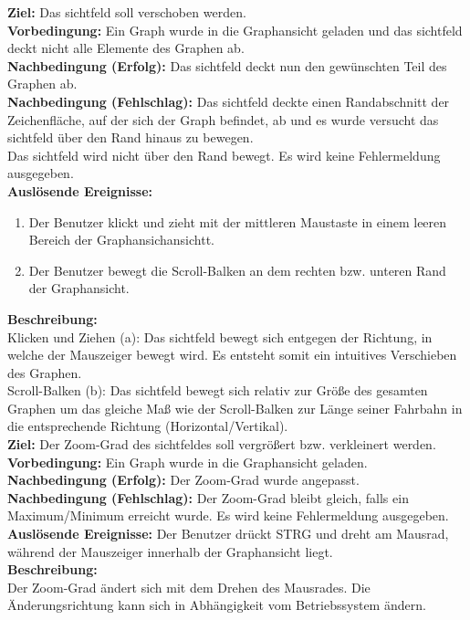\label{fa:verschieben}
\textbf{Ziel:} Das \gls{sichtfeld} soll verschoben werden.\\
\textbf{Vorbedingung:} Ein Graph wurde in die Graphansicht geladen und das \gls{sichtfeld} deckt nicht alle Elemente des Graphen ab.\\
\textbf{Nachbedingung (Erfolg):}  Das \gls{sichtfeld} deckt nun den gewünschten Teil des Graphen ab.\\
\textbf{Nachbedingung (Fehlschlag):} Das \gls{sichtfeld} deckte einen Randabschnitt der Zeichenfläche, auf der sich der Graph befindet, ab und es wurde versucht das \gls{sichtfeld} über den Rand hinaus zu bewegen.\\
Das \gls{sichtfeld} wird nicht über den Rand bewegt. Es wird keine Fehlermeldung ausgegeben.\\
\textbf{Auslösende Ereignisse:}
\begin{enumerate}[nolistsep, label=(\alph*)]
  \item Der Benutzer klickt und zieht mit der mittleren Maustaste in einem leeren Bereich der Graphansichansichtt.
  \item Der Benutzer bewegt die Scroll-Balken an dem rechten bzw. unteren Rand der Graphansicht.
\end{enumerate}
\textbf{Beschreibung:}\\
Klicken und Ziehen (a): Das \gls{sichtfeld} bewegt sich entgegen der Richtung, in welche der Mauszeiger bewegt wird. Es entsteht somit ein intuitives Verschieben des Graphen.\\
Scroll-Balken (b): Das \gls{sichtfeld} bewegt sich relativ zur Größe des gesamten Graphen um das gleiche Maß wie der Scroll-Balken zur Länge seiner Fahrbahn in die entsprechende Richtung (Horizontal/Vertikal).\\

\label{fa:zoom}
\textbf{Ziel:} Der Zoom-Grad des \gls{sichtfeld}es soll vergrößert bzw. verkleinert werden.\\
\textbf{Vorbedingung:} Ein Graph wurde in die Graphansicht geladen.\\
\textbf{Nachbedingung (Erfolg):} Der Zoom-Grad wurde angepasst.\\
\textbf{Nachbedingung (Fehlschlag):} Der Zoom-Grad bleibt gleich, falls ein Maximum/Minimum erreicht wurde. Es wird keine Fehlermeldung ausgegeben.\\
\textbf{Auslösende Ereignisse:} Der Benutzer drückt STRG und dreht am Mausrad, während der Mauszeiger innerhalb der Graphansicht liegt.\\
\textbf{Beschreibung:}\\
Der Zoom-Grad ändert sich mit dem Drehen des Mausrades. Die Änderungsrichtung kann sich in Abhängigkeit vom Betriebssystem ändern.\\

